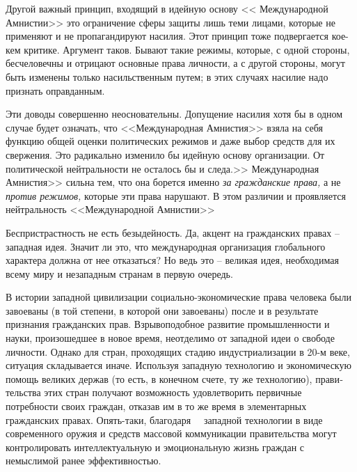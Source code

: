 \documentclass{book}
\begin{document}
Другой важный принцип, входящий в идейную основу << Меж­дународной Амнистии>> это ограничение сферы защиты лишь теми лицами, которые не применяют и не пропагандируют на­силия. Этот принцип тоже подвергается кое-кем критике. Ар­гумент таков. Бывают такие режимы, которые, с одной сторо­ны, бесчеловечны и отрицают основные права личности, а с другой стороны, могут быть изменены только насильственным путем; в этих случаях насилие надо признать оправданным.

Эти доводы совершенно неосновательны. Допущение насилия хотя бы в одном случае будет означать, что <<Международная Амнистия>> взяла на себя функцию общей оценки политических режимов и даже выбор средств для их свержения. Это ради­кально изменило бы идейную основу организации. От полити­ческой нейтральности не осталось бы и следа.>> Международная Амнистия>> сильна тем, что она борется именно \textit{за гражданские права,}  а не \textit{против режимов,}  которые эти права нарушают. В этом различии и проявляется нейтральность <<Международной Амнистии>>

Беспристрастность не есть безыдейность. Да, акцент на граж­данских правах -- западная идея. Значит ли это, что междуна­родная организация глобального характера должна от нее отка­заться? Но ведь это -- великая идея, необходимая всему миру и незападным странам в первую очередь.

В истории западной цивилизации социально-экономические права человека были завоеваны (в той степени, в которой они завоеваны) после и в результате признания гражданских прав. Взрывоподобное развитие промышленности и науки, произо­шедшее в новое время, неотделимо от западной идеи о сво­боде личности. Однако для стран, проходящих стадию инду­стриализации в 20-м веке, ситуация складывается иначе. Исполь­зуя западную технологию и экономическую помощь великих держав (то есть, в конечном счете, ту же технологию), прави­тельства этих стран получают возможность удовлетворить первичные потребности своих граждан, отказав им в то же время в элементарных гражданских правах. Опять-таки, благо­даря   западной технологии в виде современного оружия и средств массовой коммуникации правительства могут кон­тролировать интеллектуальную и эмоциональную жизнь граж­дан с немыслимой ранее эффективностью.
\end{document}
